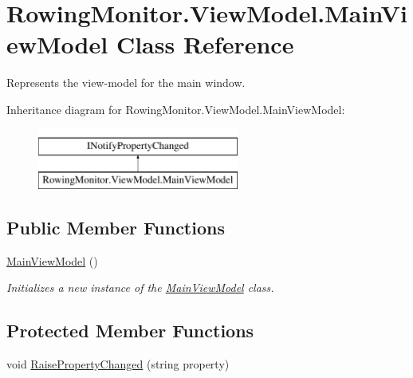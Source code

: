 \hypertarget{class_rowing_monitor_1_1_view_model_1_1_main_view_model}{}\section{Rowing\+Monitor.\+View\+Model.\+Main\+View\+Model Class Reference}
\label{class_rowing_monitor_1_1_view_model_1_1_main_view_model}


Represents the view-\/model for the main window.  


Inheritance diagram for Rowing\+Monitor.\+View\+Model.\+Main\+View\+Model\+:\begin{figure}[H]
\begin{center}
\leavevmode
\includegraphics[height=2.000000cm]{class_rowing_monitor_1_1_view_model_1_1_main_view_model}
\end{center}
\end{figure}
\subsection*{Public Member Functions}
\begin{DoxyCompactItemize}
\item 
\hyperlink{class_rowing_monitor_1_1_view_model_1_1_main_view_model_a52869d6dbed480afdc4bdebf10d4ff15}{Main\+View\+Model} ()
\begin{DoxyCompactList}\small\item\em Initializes a new instance of the \hyperlink{class_rowing_monitor_1_1_view_model_1_1_main_view_model}{Main\+View\+Model} class. \end{DoxyCompactList}\end{DoxyCompactItemize}
\subsection*{Protected Member Functions}
\begin{DoxyCompactItemize}
\item 
void \hyperlink{class_rowing_monitor_1_1_view_model_1_1_main_view_model_afd603b400bc0a127b8005f09850fede0}{Raise\+Property\+Changed} (string property)
\end{DoxyCompactItemize}
